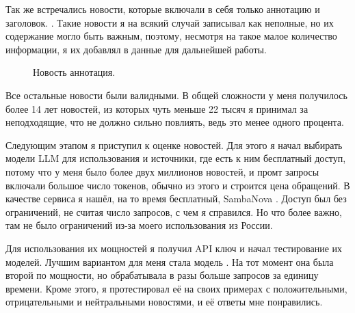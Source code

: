 \documentclass[12pt, a4paper]{article}
\begin{document}
Так же встречались новости, которые включали в себя только аннотацию и заголовок. . Такие новости я на всякий случай записывал как неполные, но их содержание могло быть важным, поэтому, несмотря на такое малое количество информации, я их добавлял в данные для дальнейшей работы.
\begin{figure}[h!]
\caption{Новость аннотация.}
\label{fig:annotation}
\end{figure}

Все остальные новости были валидными. В общей сложности у меня получилось более 14 лет новостей, из которых чуть меньше 22 тысяч я принимал за неподходящие, что не должно сильно повлиять, ведь это менее одного процента.

Следующим этапом я приступил к оценке новостей. Для этого я начал выбирать модели LLM для использования и источники, где есть к ним бесплатный доступ, потому что у меня было более двух миллионов новостей, и промт запросы включали большое число токенов, обычно из этого и строится цена обращений. В качестве сервиса я нашёл, на то время бесплатный, SambaNova \cite{sambanova}. Доступ был без ограничений, не считая число запросов, с чем я справился. Но что более важно, там не было ограничений из-за моего использования из России.

Для использования их мощностей я получил API ключ и начал тестирование их моделей. Лучшим вариантом для меня стала модель . На тот момент она была второй по мощности, но обрабатывала в разы больше запросов за единицу времени. Кроме этого, я протестировал её на своих примерах с положительными, отрицательными и нейтральными новостями, и её ответы мне понравились.
\end{document}
